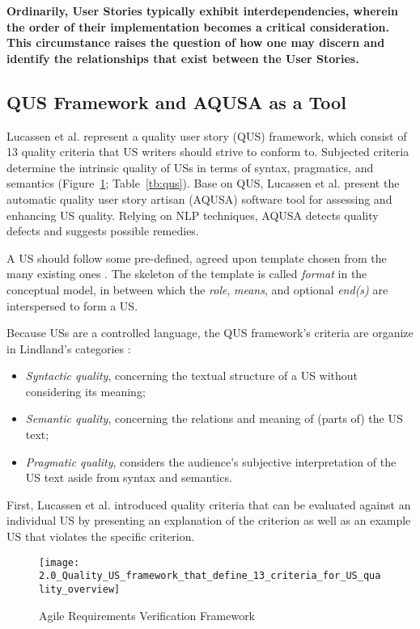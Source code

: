 \textbf{Ordinarily, User Stories typically exhibit interdependencies, wherein the order of their implementation becomes a critical consideration. This circumstance raises the question of how one may discern and identify the relationships that exist between the User Stories.}

\subsection{QUS Framework and AQUSA as a Tool}\label{quality-framework}
Lucassen et al. \cite{lucassen2016improving} represent a quality user story (QUS) framework, which consist of 13 quality criteria that US writers should strive to conform to. Subjected criteria determine the intrinsic quality of USs in terms of syntax, pragmatics, and semantics (Figure~\ref{fig:qus_framework}; Table~\ref{tb:qus}). Base on QUS, Lucassen et al. present the automatic quality user story artisan (AQUSA) software tool for assessing and enhancing US quality. Relying on NLP techniques, AQUSA detects quality defects and suggests possible remedies.

A US should follow some pre-defined, agreed upon template chosen from the many existing ones \cite{wautelet2014unifying}. The skeleton of the template is called \emph{format} in the conceptual model, in between which the \emph{role}, \emph{means}, and optional \emph{end(s)} are interspersed to form a US. 

Because USs are a controlled language, the QUS framework’s criteria are organize in Lindland’s categories \cite{lindland1994understanding}:

\begin{itemize}
\item\emph{ Syntactic quality}, concerning the textual structure of a US without considering its meaning;
\item \emph{Semantic quality}, concerning the relations and meaning of (parts of) the US text;
\item \emph{Pragmatic quality}, considers the audience’s subjective interpretation of the US text aside from syntax and semantics.
\end{itemize}

First, Lucassen et al. introduced quality criteria that can be evaluated against an individual US by presenting an explanation of the criterion as well as an example US that violates the specific criterion.


\begin{figure}
\center
\texttt{[image: 2.0\_Quality\_US\_framework\_that\_define\_13\_criteria\_for\_US\_quality\_overview]}
\caption{Agile Requirements Verification Framework \cite{lucassen2016improving}}\label{fig:qus_framework}
\end{figure}

